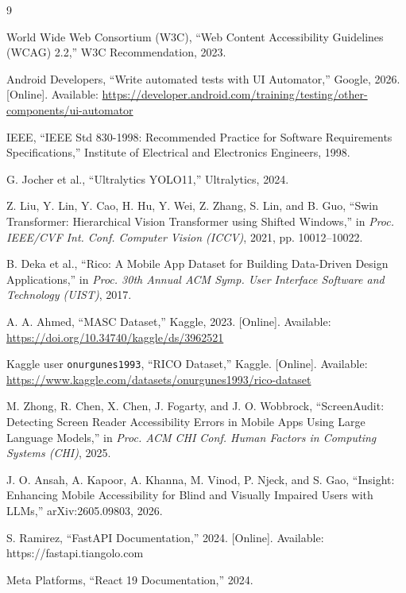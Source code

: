 \documentclass[10pt,conference]{IEEEtran}
\begin{document}
\begin{thebibliography}{9}

 World Wide Web Consortium (W3C), ``Web Content Accessibility Guidelines (WCAG) 2.2,'' W3C Recommendation, 2023.

 Android Developers, ``Write automated tests with UI Automator,'' Google, 2026. [Online]. Available: \url{https://developer.android.com/training/testing/other-components/ui-automator}

 IEEE, ``IEEE Std 830-1998: Recommended Practice for Software Requirements Specifications,'' Institute of Electrical and Electronics Engineers, 1998.

 G. Jocher et al., ``Ultralytics YOLO11,'' Ultralytics, 2024.

 Z. Liu, Y. Lin, Y. Cao, H. Hu, Y. Wei, Z. Zhang, S. Lin, and B. Guo, ``Swin Transformer: Hierarchical Vision Transformer using Shifted Windows,'' in \emph{Proc. IEEE/CVF Int. Conf. Computer Vision (ICCV)}, 2021, pp. 10012--10022.

 B. Deka et al., ``Rico: A Mobile App Dataset for Building Data-Driven Design Applications,'' in \emph{Proc. 30th Annual ACM Symp. User Interface Software and Technology (UIST)}, 2017.

 A. A. Ahmed, ``MASC Dataset,'' Kaggle, 2023. [Online]. Available: \url{https://doi.org/10.34740/kaggle/ds/3962521}

 Kaggle user \texttt{onurgunes1993}, ``RICO Dataset,'' Kaggle. [Online]. Available: \url{https://www.kaggle.com/datasets/onurgunes1993/rico-dataset}

 M. Zhong, R. Chen, X. Chen, J. Fogarty, and J. O. Wobbrock, ``ScreenAudit: Detecting Screen Reader Accessibility Errors in Mobile Apps Using Large Language Models,'' in \emph{Proc. ACM CHI Conf. Human Factors in Computing Systems (CHI)}, 2025.

 J. O. Ansah, A. Kapoor, A. Khanna, M. Vinod, P. Njeck, and S. Gao, ``Insight: Enhancing Mobile Accessibility for Blind and Visually Impaired Users with LLMs,'' arXiv:2605.09803, 2026.

 S. Ramirez, ``FastAPI Documentation,'' 2024. [Online]. Available: https://fastapi.tiangolo.com

 Meta Platforms, ``React 19 Documentation,'' 2024.

\end{thebibliography}
\end{document}
